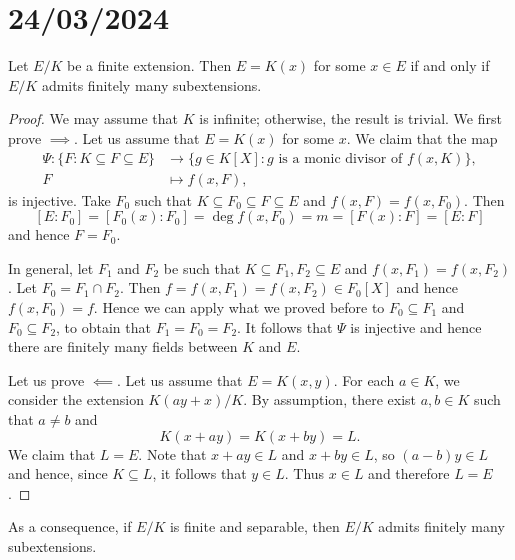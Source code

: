 \section{24/03/2024}


\begin{theorem}[Steinitz]
    Let $E/K$ be a finite extension. Then $E=K(x)$ for some $x\in E$ 
    if and only if $E/K$ admits finitely many subextensions. 
\end{theorem}

\begin{proof}
     We may assume that $K$ is infinite; otherwise, the result is trivial. 
    We first prove $\implies$. 
    Let us 
    assume that $E=K(x)$ for some $x$. We claim that the map
    \begin{align*}
    \Psi\colon \{F:K\subseteq F\subseteq E\}&\to\{g\in K[X]:g\text{ is a monic divisor of $f(x,K)$}\},\\
    F&\mapsto f(x,F),
    \end{align*}
    is injective. 
    Take $F_0$ such that $K\subseteq F_0\subseteq F\subseteq E$ and  
    $f(x,F)=f(x,F_0)$. Then  
    \[
    [E:F_0]=[F_0(x):F_0]=\deg f(x,F_0)=m=[F(x):F]=[E:F]
    \]
    and hence $F=F_0$.
    
    In general, let  $F_1$ and $F_2$ be such that 
    $K\subseteq F_1,F_2\subseteq E$ and $f(x,F_1)=f(x,F_2)$.
    Let $F_0=F_1\cap F_2$. 
    Then $f=f(x,F_1)=f(x,F_2)\in F_0[X]$ and hence $f(x,F_0)=f$.
    Hence we can apply what we proved before to $F_0\subseteq F_1$
    and $F_0\subseteq F_2$, to obtain that $F_1=F_0=F_2$.
    It follows that $\Psi$ is injective 
    and hence there are finitely many fields between $K$ and $E$. 
    
    Let us prove $\impliedby$.  
    Let us assume that $E=K(x,y)$. For each $a\in K$, we consider
    the extension $K(ay+x)/K$. By assumption, there exist $a,b\in K$ such that
    $a\ne b$ and 
    \[
    K(x+ay)=K(x+by)=L.
    \]
    We claim that $L=E$. Note that 
    $x+ay\in L$ and $x+by\in L$, so $(a-b)y\in L$ and hence, since $K\subseteq L$, it follows that
    $y\in L$. Thus $x\in L$ and therefore $L=E$. 
\end{proof}

As a consequence, if $E/K$ is finite and separable, then $E/K$ admits
finitely many subextensions. 

